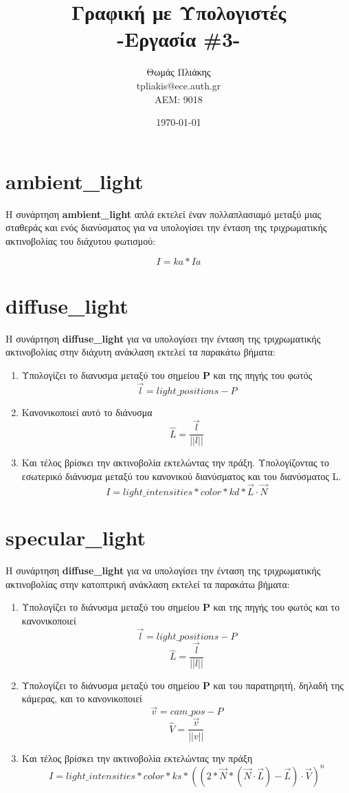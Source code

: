 \documentclass[10pt,a4paper]{article}
\title{ Γραφική με Υπολογιστές \\ -Εργασία \textlatin{\#}3-}
\author{Θωμάς Πλιάκης \\ \textlatin{tpliakis@ece.auth.gr} \\ AEM: 9018}
\date{\today}
\begin{document}
\maketitle

\section*{\textlatin{ambient\_light}}
Η συνάρτηση \textbf{\textlatin{ambient\_light}} απλά εκτελεί έναν πολλαπλασιαμό μεταξύ μιας σταθεράς και ενός διανύσματος για να υπολογίσει την ένταση της τριχρωματικής ακτινοβολίας του διάχυτου φωτισμού:

\[I = ka * Ia\]   


\section*{\textlatin{diffuse\_light}}
Η συνάρτηση \textbf{\textlatin{diffuse\_light}} για να υπολογίσει την ένταση της τριχρωματικής ακτινοβολίας στην διάχυτη ανάκλαση εκτελεί τα παρακάτω βήματα:

\begin{enumerate}
    \item Υπολογίζει το διανυσμα μεταξύ του σημείου \textbf{\textlatin{P}} και της πηγής του φωτός
    \[\vec{l} = light\_positions - P\]   
    \item Κανονικοποιεί αυτό το διάνυσμα
    \[\hat{L} = \frac{\vec{l}}{||l||}\]
    \item Και τέλος βρίσκει την ακτινοβολία εκτελώντας την πράξη. Υπολογίζοντας το εσωτερικό διάνυσμα μεταξύ του κανονικού διανύσματος και του διανύσματος \textlatin{L}.
    \[I = light\_intensities*color*kd*{\vec{L}}\cdot{\vec{N}}\] 
\end{enumerate}

\section*{\textlatin{specular\_light}}
Η συνάρτηση \textbf{\textlatin{diffuse\_light}} για να υπολογίσει την ένταση της τριχρωματικής ακτινοβολίας στην κατοπτρική ανάκλαση εκτελεί τα παρακάτω βήματα:

\begin{enumerate}
    \item Υπολογίζει το διάνυσμα μεταξύ του σημείου \textbf{\textlatin{P}}  και της πηγής του φωτός και το κανονικοποιεί 
    \[\vec{l} = light\_positions - P\]   
    \[\hat{L} = \frac{\vec{l}}{||l||}\]
    \item Υπολογίζει το διάνυσμα μεταξύ του σημείου \textbf{\textlatin{P}} και του παρατηρητή, δηλαδή της κάμερας, και το κανονικοποιεί 
    \[\vec{v} = cam\_pos - P\]   
    \[\hat{V} = \frac{\vec{v}}{||v||}\]
    \item Και τέλος βρίσκει την ακτινοβολία εκτελώντας την πράξη
    \[I = light\_intensities*color*ks*((2*\vec{N}*({\vec{N}}\cdot{\vec{L}})- \vec{L})\cdot{\vec{V}})^n\]
\end{enumerate}
\end{document}
